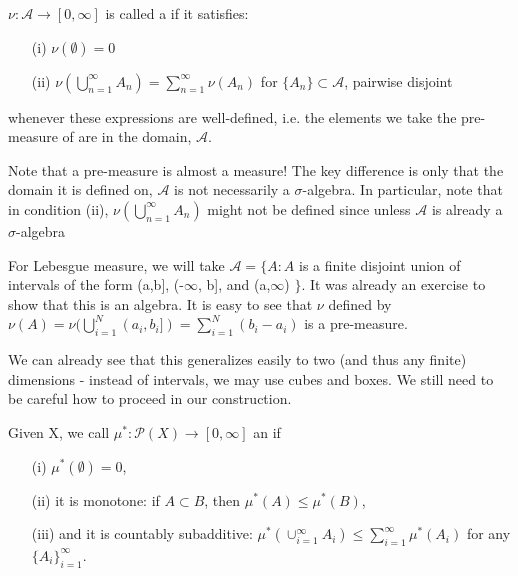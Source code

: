 \documentclass[11pt]{scrartcl}
\begin{document}
\begin{definition}
$\nu: \mathcal{A} \rightarrow [0,\infty]$ is called a  if it satisfies:
\begin{itemize}
\item[(i)] $\nu(\emptyset) = 0 $
\item[(ii)] $\nu(\bigcup_{n = 1}^\infty A_n) = \sum_{n = 1}^\infty \nu(A_n)$ for $\{A_n\}\subset \mathcal{A}$, pairwise disjoint 
\end{itemize}
whenever these expressions are well-defined, i.e. the elements we take the pre-measure of are in the domain, $\mathscr{A}$.
\end{definition}

Note that a pre-measure is almost a measure! The key difference is only that the domain it is defined on, $\mathscr{A}$ is not necessarily a $\sigma$-algebra. In particular, note that in condition (ii), $\nu(\bigcup_{n = 1}^\infty A_n)$ might not be defined since unless $\mathscr{A}$ is already a $\sigma$-algebra

\begin{example}
For Lebesgue measure, we will take $\mathcal{A} = \{A: A $ is a finite disjoint union of intervals of the form (a,b], (-$\infty$, b], and (a,$\infty$) $\}$. 
It was already an exercise to show that this is an algebra. It is easy to see that $\nu$ defined by $\nu(A) = \nu(\bigcup_{i=1}^N (a_i,b_i]) = \sum_{i=1}^N (b_i - a_i)$  is a pre-measure.
\end{example}

\begin{remark}
We can already see that this generalizes easily to two (and thus any finite) dimensions - instead of intervals, we may use cubes and boxes. We still need to be careful how to proceed in our construction.
\end{remark}

\begin{definition}
Given X, we call $\mu^*: \mathcal{P}(X) \rightarrow [0,\infty]$ an  if 
\begin{itemize}
\item[(i)] $\mu^*(\emptyset) = 0$,
\item[(ii)] it is monotone: if $ A \subset B$, then $\mu^*(A)\leq \mu^*(B)$,
\item[(iii)] and it is countably subadditive: $\mu^*(\cup_{i=1}^\infty A_i) \leq \sum_{i=1}^\infty \mu^*(A_i)$ for any $\{A_i\}_{i=1}^\infty$.
\end{itemize}
\end{definition}
\end{document}
